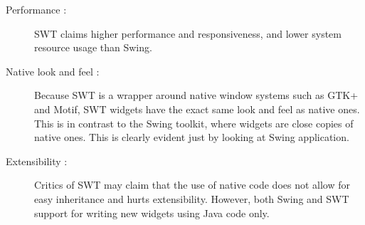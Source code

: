 \begin{description}
\item[Performance :] SWT claims higher performance and responsiveness, and lower system resource usage than Swing.
\item[Native look and feel :] Because SWT is a wrapper around native window systems such as GTK+ and Motif, SWT widgets have the exact same look and feel as native ones. This is in contrast to the Swing toolkit, where widgets are close copies of native ones. This is clearly evident just by looking at Swing application.
\item[Extensibility :] Critics of SWT may claim that the use of native code does not allow for easy inheritance and hurts extensibility. However, both Swing and SWT support for writing new widgets using Java code only.
\end{description}
